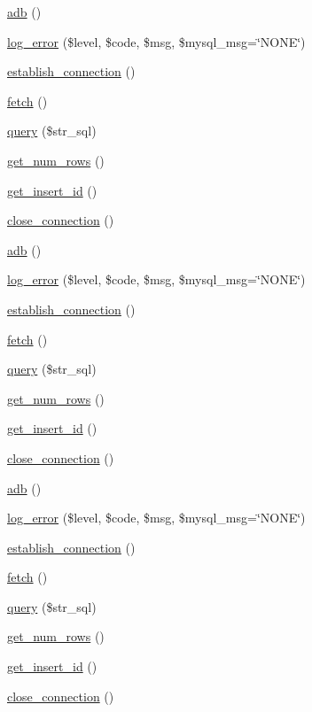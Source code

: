 \begin{DoxyCompactItemize}
\item 
\hyperlink{classadb_a0ec94bd1d566c9082e1a611c3a1621c1}{adb} ()
\item 
\hyperlink{classadb_ade547b8e282b83909e793016a85fd3ed}{log\+\_\+error} (\$level, \$code, \$msg, \$mysql\+\_\+msg=\char`\"{}N\+O\+N\+E\char`\"{})
\item 
\hyperlink{classadb_a904bc0194f30ab9a01a776f2323b43e1}{establish\+\_\+connection} ()
\item 
\hyperlink{classadb_ae48cc10bd727774bb36203986ce3b176}{fetch} ()
\item 
\hyperlink{classadb_adf1a28bfff18b65706e6a06f9b844268}{query} (\$str\+\_\+sql)
\item 
\hyperlink{classadb_a976944884a9580b5dedf902ab134352f}{get\+\_\+num\+\_\+rows} ()
\item 
\hyperlink{classadb_aa9ff9809dbdadeb1388eeddc3a4396c2}{get\+\_\+insert\+\_\+id} ()
\item 
\hyperlink{classadb_a2cd363bf0e126d967962d71e7a2c2a45}{close\+\_\+connection} ()
\item 
\hyperlink{classadb_a0ec94bd1d566c9082e1a611c3a1621c1}{adb} ()
\item 
\hyperlink{classadb_ade547b8e282b83909e793016a85fd3ed}{log\+\_\+error} (\$level, \$code, \$msg, \$mysql\+\_\+msg=\char`\"{}N\+O\+N\+E\char`\"{})
\item 
\hyperlink{classadb_a904bc0194f30ab9a01a776f2323b43e1}{establish\+\_\+connection} ()
\item 
\hyperlink{classadb_ae48cc10bd727774bb36203986ce3b176}{fetch} ()
\item 
\hyperlink{classadb_adf1a28bfff18b65706e6a06f9b844268}{query} (\$str\+\_\+sql)
\item 
\hyperlink{classadb_a976944884a9580b5dedf902ab134352f}{get\+\_\+num\+\_\+rows} ()
\item 
\hyperlink{classadb_aa9ff9809dbdadeb1388eeddc3a4396c2}{get\+\_\+insert\+\_\+id} ()
\item 
\hyperlink{classadb_a2cd363bf0e126d967962d71e7a2c2a45}{close\+\_\+connection} ()
\item 
\hyperlink{classadb_a0ec94bd1d566c9082e1a611c3a1621c1}{adb} ()
\item 
\hyperlink{classadb_ade547b8e282b83909e793016a85fd3ed}{log\+\_\+error} (\$level, \$code, \$msg, \$mysql\+\_\+msg=\char`\"{}N\+O\+N\+E\char`\"{})
\item 
\hyperlink{classadb_a904bc0194f30ab9a01a776f2323b43e1}{establish\+\_\+connection} ()
\item 
\hyperlink{classadb_ae48cc10bd727774bb36203986ce3b176}{fetch} ()
\item 
\hyperlink{classadb_adf1a28bfff18b65706e6a06f9b844268}{query} (\$str\+\_\+sql)
\item 
\hyperlink{classadb_a976944884a9580b5dedf902ab134352f}{get\+\_\+num\+\_\+rows} ()
\item 
\hyperlink{classadb_aa9ff9809dbdadeb1388eeddc3a4396c2}{get\+\_\+insert\+\_\+id} ()
\item 
\hyperlink{classadb_a2cd363bf0e126d967962d71e7a2c2a45}{close\+\_\+connection} ()
\end{DoxyCompactItemize}
